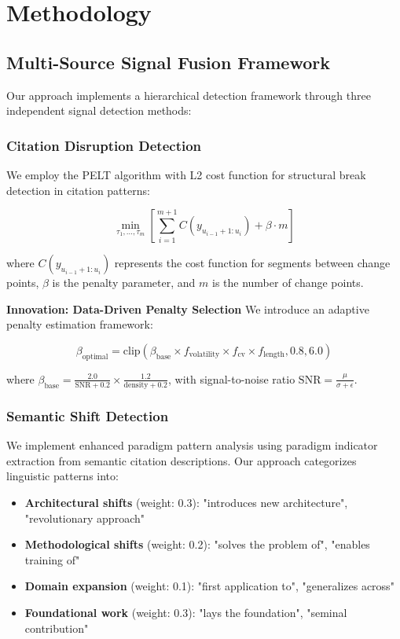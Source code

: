 \documentclass[conference]{IEEEtran}
\begin{document}
\section{Methodology}

\subsection{Multi-Source Signal Fusion Framework}

Our approach implements a hierarchical detection framework through three independent signal detection methods:

\subsubsection{Citation Disruption Detection}

We employ the PELT algorithm with L2 cost function for structural break detection in citation patterns:

\begin{equation}
\min_{\tau_1,\ldots,\tau_m} \left[\sum_{i=1}^{m+1} C(y_{u_{i-1}+1:u_i}) + \beta \cdot m\right]
\end{equation}

where $C(y_{u_{i-1}+1:u_i})$ represents the cost function for segments between change points, $\beta$ is the penalty parameter, and $m$ is the number of change points.

\textbf{Innovation: Data-Driven Penalty Selection}
We introduce an adaptive penalty estimation framework:

\begin{equation}
\beta_{\text{optimal}} = \text{clip}\left(\beta_{\text{base}} \times f_{\text{volatility}} \times f_{\text{cv}} \times f_{\text{length}}, 0.8, 6.0\right)
\end{equation}

where $\beta_{\text{base}} = \frac{2.0}{\text{SNR} + 0.2} \times \frac{1.2}{\text{density} + 0.2}$, with signal-to-noise ratio $\text{SNR} = \frac{\mu}{\sigma + \epsilon}$.

\subsubsection{Semantic Shift Detection}

We implement enhanced paradigm pattern analysis using paradigm indicator extraction from semantic citation descriptions. Our approach categorizes linguistic patterns into:

\begin{itemize}
\item \textbf{Architectural shifts} (weight: 0.3): "introduces new architecture", "revolutionary approach"
\item \textbf{Methodological shifts} (weight: 0.2): "solves the problem of", "enables training of"
\item \textbf{Domain expansion} (weight: 0.1): "first application to", "generalizes across"  
\item \textbf{Foundational work} (weight: 0.3): "lays the foundation", "seminal contribution"
\end{itemize}
\end{document}
